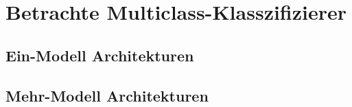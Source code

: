 \section{Betrachte Multiclass-Klasszifizierer}

\subsection{Ein-Modell Architekturen}

\subsection{Mehr-Modell Architekturen}